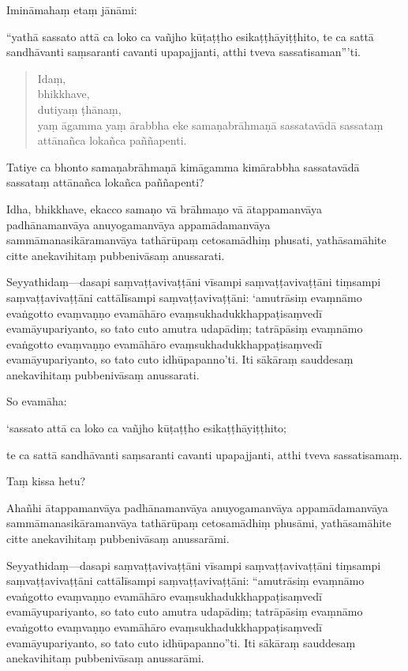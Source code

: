 \documentclass[11pt,twoside,openright]{book}
\begin{document}
\pstart
Imināmahaṃ etaṃ jānāmi:
\pend

\pstart
“yathā sassato attā ca loko ca vañjho kūṭaṭṭho esikaṭṭhāyiṭṭhito, te ca sattā sandhāvanti saṃsaranti cavanti upapajjanti, atthi tveva sassatisaman”’ti.
\pend

\begin{verse}
Idaṃ,\\
\vin  bhikkhave,\\
\vin  dutiyaṃ ṭhānaṃ,\\
\vin  yaṃ āgamma yaṃ ārabbha eke samaṇabrāhmaṇā sassatavādā sassataṃ attānañca lokañca paññapenti.

\end{verse}
\pstart
Tatiye ca bhonto samaṇabrāhmaṇā kimāgamma kimārabbha sassatavādā sassataṃ attānañca lokañca paññapenti?
\pend

\pstart
Idha, bhikkhave, ekacco samaṇo vā brāhmaṇo vā ātappamanvāya padhānamanvāya anuyogamanvāya appamādamanvāya sammāmanasikāramanvāya tathārūpaṃ cetosamādhiṃ phusati, yathāsamāhite citte anekavihitaṃ pubbenivāsaṃ anussarati.
\pend

\pstart
Seyyathidaṃ—dasapi saṃvaṭṭavivaṭṭāni vīsampi saṃvaṭṭavivaṭṭāni tiṃsampi saṃvaṭṭavivaṭṭāni cattālīsampi saṃvaṭṭavivaṭṭāni: ‘amutrāsiṃ evaṃnāmo evaṅgotto evaṃvaṇṇo evamāhāro evaṃsukhadukkhappaṭisaṃvedī evamāyupariyanto, so tato cuto amutra udapādiṃ; tatrāpāsiṃ evaṃnāmo evaṅgotto evaṃvaṇṇo evamāhāro evaṃsukhadukkhappaṭisaṃvedī evamāyupariyanto, so tato cuto idhūpapanno’ti. Iti sākāraṃ sauddesaṃ anekavihitaṃ pubbenivāsaṃ anussarati.
\pend

\pstart
So evamāha:
\pend

\pstart
‘sassato attā ca loko ca vañjho kūṭaṭṭho esikaṭṭhāyiṭṭhito;
\pend

\pstart
te ca sattā sandhāvanti saṃsaranti cavanti upapajjanti, atthi tveva sassatisamaṃ.
\pend

\pstart
Taṃ kissa hetu?
\pend

\pstart
Ahañhi ātappamanvāya padhānamanvāya anuyogamanvāya appamādamanvāya sammāmanasikāramanvāya tathārūpaṃ cetosamādhiṃ phusāmi, yathāsamāhite citte anekavihitaṃ pubbenivāsaṃ anussarāmi.
\pend

\pstart
Seyyathidaṃ—dasapi saṃvaṭṭavivaṭṭāni vīsampi saṃvaṭṭavivaṭṭāni tiṃsampi saṃvaṭṭavivaṭṭāni cattālīsampi saṃvaṭṭavivaṭṭāni: “amutrāsiṃ evaṃnāmo evaṅgotto evaṃvaṇṇo evamāhāro evaṃsukhadukkhappaṭisaṃvedī evamāyupariyanto, so tato cuto amutra udapādiṃ; tatrāpāsiṃ evaṃnāmo evaṅgotto evaṃvaṇṇo evamāhāro evaṃsukhadukkhappaṭisaṃvedī evamāyupariyanto, so tato cuto idhūpapanno”ti. Iti sākāraṃ sauddesaṃ anekavihitaṃ pubbenivāsaṃ anussarāmi.
\pend
\end{document}
